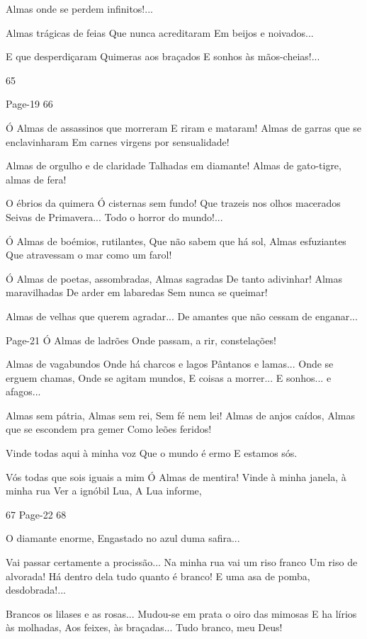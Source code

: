 Almas onde se perdem infinitos!...

Almas trágicas de feias
Que nunca acreditaram
Em beijos e noivados...

E que desperdiçaram
Quimeras aos braçados
E sonhos às mãos-cheias!...

65



Page-19
66

Ó Almas de assassinos que morreram
E riram e mataram!
Almas de garras que se enclavinharam
Em carnes virgens por sensualidade!

Almas de orgulho e de claridade
Talhadas em diamante!
Almas de gato-tigre, almas de fera!

O ébrios da quimera
Ó cisternas sem fundo!
Que trazeis nos olhos macerados
Seivas de Primavera...
Todo o horror do mundo!...

Ó Almas de boémios, rutilantes,
Que não sabem que há sol,
Almas esfuziantes
Que atravessam o mar como um farol!

Ó Almas de poetas, assombradas,
Almas sagradas
De tanto adivinhar!
Almas maravilhadas
De arder em labaredas
Sem nunca se queimar!

Almas de velhas que querem agradar...
De amantes que não cessam de enganar...


Page-21
Ó Almas de ladrões
Onde passam, a rir, constelações!

Almas de vagabundos
Onde há charcos e lagos
Pântanos e lamas...
Onde se erguem chamas,
Onde se agitam mundos,
E coisas a morrer...
E sonhos... e afagos...

Almas sem pátria,
Almas sem rei,
Sem fé nem lei!
Almas de anjos caídos,
Almas que se escondem pra gemer
Como leões feridos!

Vinde todas aqui à minha voz
Que o mundo é ermo
E estamos sós.

Vós todas que sois iguais a mim
Ó Almas de mentira!
Vinde à minha janela, à minha rua
Ver a ignóbil Lua,
A Lua informe,



67
Page-22
68

O diamante enorme,
Engastado no azul duma safira...

Vai passar certamente a procissão...
Na minha rua vai um riso franco
Um riso de alvorada!
Há dentro dela tudo quanto é branco!
E uma asa de pomba, desdobrada!...

Brancos os lilases e as rosas...
Mudou-se em prata o oiro das mimosas
E ha lírios às molhadas,
Aos feixes, às braçadas...
Tudo branco, meu Deus!

